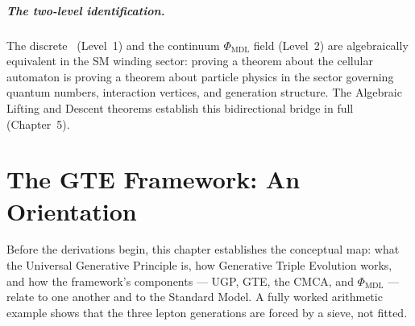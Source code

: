 \documentclass[11pt,openany]{book}
\theoremstyle{remark}
\newcommand{\PHIMDL}{\Phi_{\mathrm{MDL}}}
\newcommand{\CMCA}{\text{CMCA}}
\begin{document}
\begin{figure}[H]
{%
}%
\end{figure}

\paragraph{The two-level identification.}
The discrete \CMCA\ (Level~1) and the continuum $\PHIMDL$ field (Level~2) are algebraically
equivalent in the SM winding sector: proving a theorem about the cellular automaton is proving
a theorem about particle physics in the sector governing quantum numbers, interaction vertices,
and generation structure.
The Algebraic Lifting and Descent theorems establish this bidirectional bridge in full (Chapter~5).

\chapter{The GTE Framework: An Orientation}
\label{chap:orientation}

\begin{tcolorbox}[colback=blue!5,colframe=blue!50!black,title={Chapter~2 Purpose}]
Before the derivations begin, this chapter establishes the conceptual map: what the
Universal Generative Principle is, how Generative Triple Evolution works, and how the
framework's components --- UGP, GTE, the CMCA, and $\Phi_{\mathrm{MDL}}$ --- relate to
one another and to the Standard Model. A fully worked arithmetic example shows that the
three lepton generations are forced by a sieve, not fitted.
\end{tcolorbox}
\end{document}
